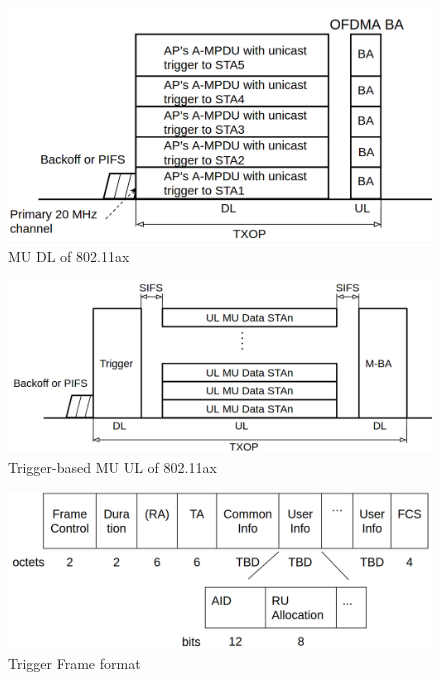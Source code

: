 \documentclass[journal]{IEEEtran}
\begin{document}
\begin{figure}[!t]
\includegraphics[scale=0.23]{./figure/Section_preliminary/fig_MU_DL.png}
\caption{MU DL of 802.11ax}
\label{fig_MU_DL}
\end{figure}


\begin{figure}[!t]
\includegraphics[scale=0.21]{./figure/Section_preliminary/fig_MU_UL.png}
\caption{Trigger-based MU UL of 802.11ax}
\label{fig_MU_UL}
\end{figure}

\begin{figure}[!t]
\includegraphics[scale=0.2]{./figure/Section_preliminary/fig_tf_format.png}
\caption{Trigger Frame format}
\label{fig_TF_format}
\end{figure}
\end{document}
